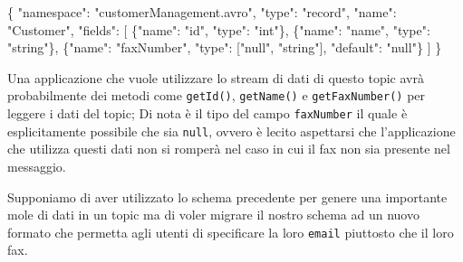 \documentclass[]{article}
\newenvironment{Shaded}{}{}
\newcommand{\DataTypeTok}[1]{\textcolor[rgb]{0.56,0.13,0.00}{#1}}
\newcommand{\StringTok}[1]{\textcolor[rgb]{0.25,0.44,0.63}{#1}}
\newcommand{\OtherTok}[1]{\textcolor[rgb]{0.00,0.44,0.13}{#1}}
\newcommand{\FunctionTok}[1]{\textcolor[rgb]{0.02,0.16,0.49}{#1}}
\begin{document}
\small

\begin{Shaded}
\begin{Highlighting}[]
\FunctionTok{\{}
    \DataTypeTok{"namespace"}\FunctionTok{:} \StringTok{"customerManagement.avro"}\FunctionTok{,}
    \DataTypeTok{"type"}\FunctionTok{:} \StringTok{"record"}\FunctionTok{,}
    \DataTypeTok{"name"}\FunctionTok{:} \StringTok{"Customer"}\FunctionTok{,}
    \DataTypeTok{"fields"}\FunctionTok{:} \OtherTok{[}
         \FunctionTok{\{}\DataTypeTok{"name"}\FunctionTok{:} \StringTok{"id"}\FunctionTok{,} \DataTypeTok{"type"}\FunctionTok{:} \StringTok{"int"}\FunctionTok{\}}\OtherTok{,}
         \FunctionTok{\{}\DataTypeTok{"name"}\FunctionTok{:} \StringTok{"name"}\FunctionTok{,}  \DataTypeTok{"type"}\FunctionTok{:} \StringTok{"string"}\FunctionTok{\}}\OtherTok{,}
         \FunctionTok{\{}\DataTypeTok{"name"}\FunctionTok{:} \StringTok{"faxNumber"}\FunctionTok{,} \DataTypeTok{"type"}\FunctionTok{:} \OtherTok{[}\StringTok{"null"}\OtherTok{,} \StringTok{"string"}\OtherTok{]}\FunctionTok{,} \DataTypeTok{"default"}\FunctionTok{:} \StringTok{"null"}\FunctionTok{\}}
    \OtherTok{]}
\FunctionTok{\}}
\end{Highlighting}
\end{Shaded}

\normalsize

Una applicazione che vuole utilizzare lo stream di dati di questo topic
avrà probabilmente dei metodi come \texttt{getId()}, \texttt{getName()}
e \texttt{getFaxNumber()} per leggere i dati del topic; Di nota è il
tipo del campo \texttt{faxNumber} il quale è esplicitamente possibile
che sia \texttt{null}, ovvero è lecito aspettarsi che l'applicazione che
utilizza questi dati non si romperà nel caso in cui il fax non sia
presente nel messaggio.

Supponiamo di aver utilizzato lo schema precedente per genere una
importante mole di dati in un topic ma di voler migrare il nostro schema
ad un nuovo formato che permetta agli utenti di specificare la loro
\texttt{email} piuttosto che il loro fax.

\small
\end{document}

